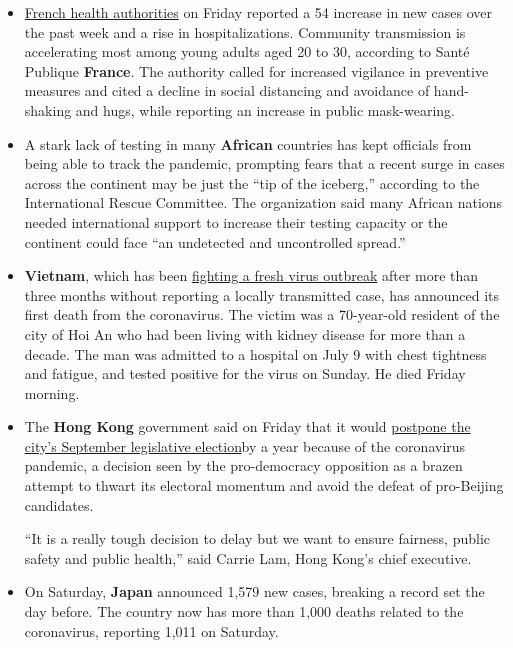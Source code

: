 \begin{itemize}
\item
  \href{https://www.santepubliquefrance.fr/maladies-et-traumatismes/maladies-et-infections-respiratoires/infection-a-coronavirus/documents/bulletin-national/covid-19-point-epidemiologique-du-30-juillet-2020}{French
  health authorities} on Friday reported a 54 increase in new cases over
  the past week and a rise in hospitalizations. Community transmission
  is accelerating most among young adults aged 20 to 30, according to
  Santé Publique \textbf{France}. The authority called for increased
  vigilance in preventive measures and cited a decline in social
  distancing and avoidance of hand-shaking and hugs, while reporting an
  increase in public mask-wearing.
\item
  A stark lack of testing in many \textbf{African} countries has kept
  officials from being able to track the pandemic, prompting fears that
  a recent surge in cases across the continent may be just the ``tip of
  the iceberg,'' according to the International Rescue Committee. The
  organization said many African nations needed international support to
  increase their testing capacity or the continent could face ``an
  undetected and uncontrolled spread.''
\item
  \textbf{Vietnam}, which has been
  \href{https://www.nytimes3xbfgragh.onion/2020/07/29/world/asia/coronavirus-vietnam.html}{fighting
  a fresh virus outbreak} after more than three months without reporting
  a locally transmitted case, has announced its first death from the
  coronavirus. The victim was a 70-year-old resident of the city of Hoi
  An who had been living with kidney disease for more than a decade. The
  man was admitted to a hospital on July 9 with chest tightness and
  fatigue, and tested positive for the virus on Sunday. He died Friday
  morning.
\item
  The \textbf{Hong Kong} government said on Friday that it would
  \href{https://www.nytimes3xbfgragh.onion/2020/07/31/world/asia/hong-kong-election-delayed.html}{postpone
  the city's September legislative election}by a year because of the
  coronavirus pandemic, a decision seen by the pro-democracy opposition
  as a brazen attempt to thwart its electoral momentum and avoid the
  defeat of pro-Beijing candidates.

  ``It is a really tough decision to delay but we want to ensure
  fairness, public safety and public health,'' said Carrie Lam, Hong
  Kong's chief executive.
\item
  On Saturday, \textbf{Japan} announced 1,579 new cases, breaking a
  record set the day before. The country now has more than 1,000 deaths
  related to the coronavirus, reporting 1,011 on Saturday.
\end{itemize}

